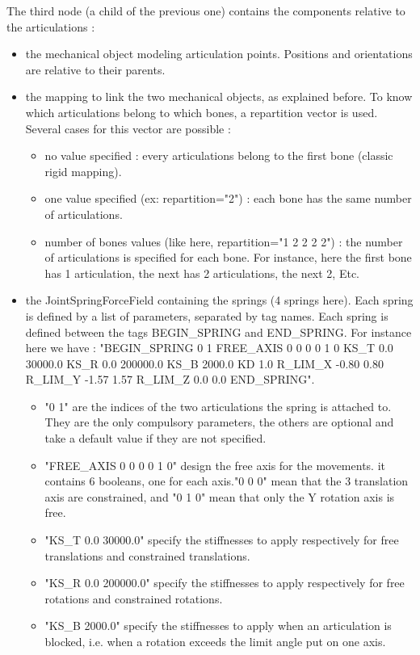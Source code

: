The third node (a child of the previous one) contains the components relative to the articulations :
\begin{itemize}
	\item the mechanical object modeling articulation points. Positions and orientations are relative to their parents.
	\item the mapping to link the two mechanical objects, as explained before. To know which articulations belong to which bones, a repartition vector is used. Several cases for this vector are possible :
		\begin{itemize}
			\item no value specified : every articulations belong to the first bone (classic rigid mapping).
			\item one value specified (ex: repartition="2") : each bone has the same number of articulations.
			\item number of bones values (like here, repartition="1 2 2 2 2") : the number of articulations is specified for each bone. For instance, here the first bone has 1 articulation, the next has 2 articulations, the next 2, Etc.
		\end{itemize}
	\item the JointSpringForceField containing the springs (4 springs here). Each spring is defined by a list of parameters, separated by tag names. Each spring is defined between the tags BEGIN\_SPRING and END\_SPRING. For instance here we have : "BEGIN\_SPRING 0 1  FREE\_AXIS 0 0 0 0 1 0  KS\_T 0.0 30000.0  KS\_R 0.0 200000.0  KS\_B 2000.0  KD 1.0  R\_LIM\_X -0.80 0.80  R\_LIM\_Y -1.57 1.57  R\_LIM\_Z 0.0 0.0  END\_SPRING".
		\begin{itemize}
			\item "0 1" are the indices of the two articulations the spring is attached to. They are the only compulsory parameters, the others are optional and take a default value if they are not specified.
			\item "FREE\_AXIS 0 0 0 0 1 0" design the free axis for the movements. it contains 6 booleans, one for each axis."0 0 0" mean that the 3 translation axis are constrained, and "0 1 0" mean that only the Y rotation axis is free.
			\item "KS\_T 0.0 30000.0" specify the stiffnesses to apply respectively for free translations and constrained translations.
			\item "KS\_R 0.0 200000.0" specify the stiffnesses to apply respectively for free rotations and constrained rotations.
			\item "KS\_B 2000.0" specify the stiffnesses to apply when an articulation is blocked, i.e. when a rotation exceeds the limit angle put on one axis.

\end{itemize}
\end{itemize}
